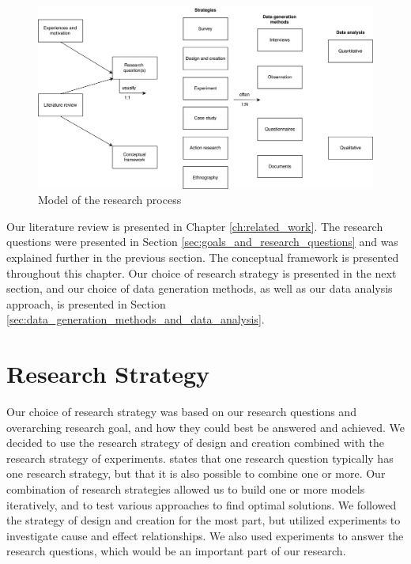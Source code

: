 \begin{figure}[ht]
    \centering
    \includegraphics[width=1\textwidth]{fig/methodology/research_strategies.png}
    \caption{Model of the research process}
    \label{fig:model_research_process}
\end{figure}

Our literature review is presented in Chapter \ref{ch:related_work}. The research questions were presented in Section \ref{sec:goals_and_research_questions} and was explained further in the previous section. The conceptual framework is presented throughout this chapter. Our choice of research strategy is presented in the next section, and our choice of data generation methods, as well as our data analysis approach, is presented in Section \ref{sec:data_generation_methods_and_data_analysis}.


\section{Research Strategy}
\label{sec:research_strategy}
Our choice of research strategy was based on our research questions and overarching research goal, and how they could best be answered and achieved. We decided to use the research strategy of design and creation combined with the research strategy of experiments. \citet[pp.~35]{oates2005researching} states that one research question typically has one research strategy, but that it is also possible to combine one or more. Our combination of research strategies allowed us to build one or more models iteratively, and to test various approaches to find optimal solutions. We followed the strategy of design and creation for the most part, but utilized experiments to investigate cause and effect relationships. We also used experiments to answer the research questions, which would be an important part of our research.

